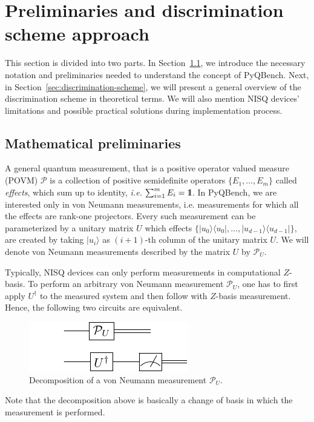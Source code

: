 \documentclass[preprint,12pt, a4paper, dvipsnames]{elsarticle}
\newcommand{\ie}{{\emph{i.e.\/}}}
\newcommand{\ket}[1]{\ensuremath{|#1\rangle}}
\newcommand{\bra}[1]{\ensuremath{\langle#1|}}
\newcommand{\ketbra}[2]{\ensuremath{\ket{#1}\bra{#2}}}
\newcommand{\proj}[1]{\ensuremath{\ketbra{#1}{#1}}}
\newcommand{\1}{{\rm 1\hspace{-0.9mm}l}}
\newcommand{\PP}{\mathcal{P}}
\begin{document}
\section{Preliminaries and discrimination scheme approach}
This section is divided into two parts.
In Section~\ref{sec:maths}, we introduce the necessary notation and preliminaries needed to understand the concept of PyQBench. Next, in Section~\ref{sec:discrimination-scheme},
we will present a general overview of the discrimination scheme in theoretical terms. We will also mention NISQ devices' limitations and possible practical solutions during implementation process.

\subsection{Mathematical preliminaries}\label{sec:maths}
A general quantum
measurement, that is a positive operator valued measure (POVM) $\PP$ is a
collection of positive semidefinite operators $\{E_1, \ldots, E_m \}$ called
\emph{effects}, which sum up to identity, \ie $ \, \, \sum_{i=1}^m E_i = \1$.
In PyQBench, we are interested only in von Neumann measurements, i.e. measurements
for which all the effects are rank-one projectors. Every such measurement can be
parameterized by a unitary matrix $U$ which effects $\{\proj{u_0}, \ldots, \proj{u_{d-1}}\}$,
are created by taking $\ket{u_i}$ as  $(i+1)$-th column of the unitary matrix $U$.
We will denote von Neumann measurements described by the matrix $U$ by $\PP_{U}$.

Typically, NISQ devices can only perform measurements in computational $Z$-basis.
To perform an arbitrary von Neumann measurement $\PP_{U}$, one has to first apply $U^\dagger$
to the measured system and then follow with $Z$-basis measurement. Hence, the following two
circuits are equivalent.

\begin{figure}[h!]
	\centering
	\includegraphics[scale=1.7]{pics/vonneuman}
	\caption{Decomposition of a von Neumann measurement $\PP_{U}$. }
	\label{fig:vonnneuman}
\end{figure}

Note that the decomposition above is basically a change of basis in which the measurement
is performed.
\end{document}
